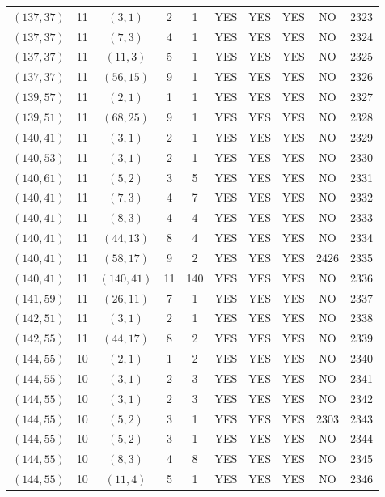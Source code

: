 \begin{longtable}{|c|c|c|c|c|c|c|c|c|c|}
$(137, 37)$ & 11 & $(3, 1)$ & 2 & 1 & YES & YES & YES & NO & 2323\\
$(137, 37)$ & 11 & $(7, 3)$ & 4 & 1 & YES & YES & YES & NO & 2324\\
$(137, 37)$ & 11 & $(11, 3)$ & 5 & 1 & YES & YES & YES & NO & 2325\\
$(137, 37)$ & 11 & $(56, 15)$ & 9 & 1 & YES & YES & YES & NO & 2326\\
$(139, 57)$ & 11 & $(2, 1)$ & 1 & 1 & YES & YES & YES & NO & 2327\\
$(139, 51)$ & 11 & $(68, 25)$ & 9 & 1 & YES & YES & YES & NO & 2328\\
$(140, 41)$ & 11 & $(3, 1)$ & 2 & 1 & YES & YES & YES & NO & 2329\\
$(140, 53)$ & 11 & $(3, 1)$ & 2 & 1 & YES & YES & YES & NO & 2330\\
$(140, 61)$ & 11 & $(5, 2)$ & 3 & 5 & YES & YES & YES & NO & 2331\\
$(140, 41)$ & 11 & $(7, 3)$ & 4 & 7 & YES & YES & YES & NO & 2332\\
$(140, 41)$ & 11 & $(8, 3)$ & 4 & 4 & YES & YES & YES & NO & 2333\\
$(140, 41)$ & 11 & $(44, 13)$ & 8 & 4 & YES & YES & YES & NO & 2334\\
$(140, 41)$ & 11 & $(58, 17)$ & 9 & 2 & YES & YES & YES & 2426 & 2335\\
$(140, 41)$ & 11 & $(140, 41)$ & 11 & 140 & YES & YES & YES & NO & 2336\\
$(141, 59)$ & 11 & $(26, 11)$ & 7 & 1 & YES & YES & YES & NO & 2337\\
$(142, 51)$ & 11 & $(3, 1)$ & 2 & 1 & YES & YES & YES & NO & 2338\\
$(142, 55)$ & 11 & $(44, 17)$ & 8 & 2 & YES & YES & YES & NO & 2339\\
$(144, 55)$ & 10 & $(2, 1)$ & 1 & 2 & YES & YES & YES & NO & 2340\\
$(144, 55)$ & 10 & $(3, 1)$ & 2 & 3 & YES & YES & YES & NO & 2341\\
$(144, 55)$ & 10 & $(3, 1)$ & 2 & 3 & YES & YES & YES & NO & 2342\\
$(144, 55)$ & 10 & $(5, 2)$ & 3 & 1 & YES & YES & YES & 2303 & 2343\\
$(144, 55)$ & 10 & $(5, 2)$ & 3 & 1 & YES & YES & YES & NO & 2344\\
$(144, 55)$ & 10 & $(8, 3)$ & 4 & 8 & YES & YES & YES & NO & 2345\\
$(144, 55)$ & 10 & $(11, 4)$ & 5 & 1 & YES & YES & YES & NO & 2346\\

\end{longtable}
